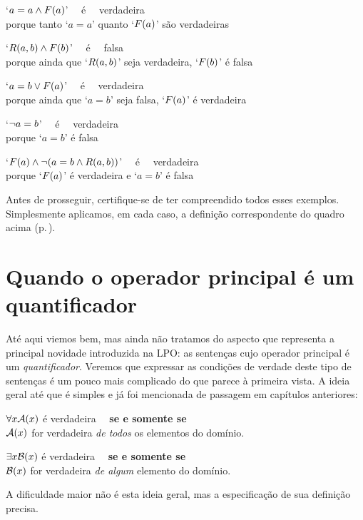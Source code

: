 	\begin{earg}
		\item[\textbullet] `$a = a \wedge \mathord{F}(a)$' \ \ é \ \ verdadeira\\
			porque tanto `$a = a$' quanto `$\mathord{F}(a)$' são verdadeiras
		\item[\textbullet] `$\mathord{R}(a,b) \wedge \mathord{F}(b)$' \ \ é \ \ falsa\\
			porque ainda que `$\mathord{R}(a,b)$' seja verdadeira, `$\mathord{F}(b)$' é falsa\\
		\item[\textbullet] `$a = b \vee \mathord{F}(a)$' \ \ é \ \ verdadeira\\
			porque ainda que  `$a = b$' seja falsa, `$\mathord{F}(a)$' é verdadeira\\
		\item[\textbullet] `$\neg a = b$' \ \ é \ \ verdadeira\\
			porque `$a = b$' é falsa\\
		\item[\textbullet] `$\mathord{F}(a) \wedge \neg( a= b \wedge \mathord{R}(a,b))$' \ \ é \ \ verdadeira\\
			porque `$\mathord{F}(a)$' é verdadeira e `$a = b$' é falsa
	\end{earg}
Antes de prosseguir, certifique-se de ter compreendido todos esses exemplos.
Simplesmente aplicamos, em cada caso, a definição correspondente do quadro acima (p.\,\pageref{b:ConSent}). 


\section[Quantificadores]{Quando o operador principal é um quantificador}\label{s:MainLogicalOperatorQuantifier}
Até aqui viemos bem, mas ainda não tratamos do aspecto que representa a principal novidade introduzida na LPO:
as sentenças cujo operador principal é um \emph{quantificador}.
Veremos que expressar as condições de verdade deste tipo de sentenças é um pouco mais complicado do que parece à primeira vista.
A ideia geral até que é simples e já foi mencionada de passagem em capítulos anteriores:
	\begin{earg}
		\item[\textbullet] $\forall x \mathord{\mathcal{A}}(x)$ é verdadeira \ \ \textbf{se e somente se}\\
		$\mathord{\mathcal{A}}(x)$ for verdadeira \textit{de todos} os elementos do domínio.\\
		\item[\textbullet] $\exists x \mathord{\mathcal{B}}(x)$ é verdadeira \ \ \textbf{se e somente se}\\
		$\mathord{\mathcal{B}}(x)$ for verdadeira \textit{de algum} elemento do domínio.
	\end{earg}
A dificuldade maior não é esta ideia geral, mas a especificação de sua definição precisa.

